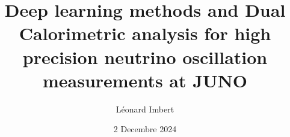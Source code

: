 





\author{L\'{e}onard Imbert}

\title{Deep learning methods and Dual Calorimetric analysis for high precision neutrino oscillation measurements at JUNO}

\date{2 Decembre 2024}



